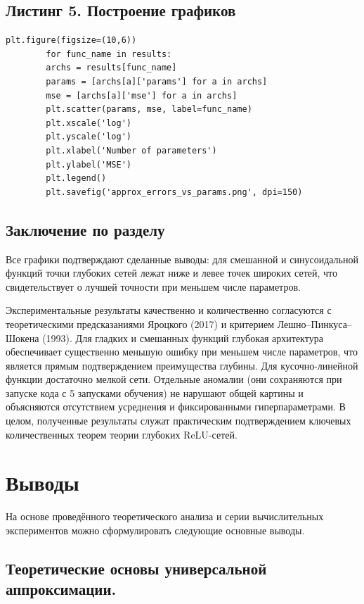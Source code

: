 \documentclass[12pt]{article}
\begin{document}
	\subsection*{Листинг 5. Построение графиков}
	\begin{lstlisting}[caption={Создание графика ошибки от числа параметров}, label=lst:plot]
		plt.figure(figsize=(10,6))
		for func_name in results:
		archs = results[func_name]
		params = [archs[a]['params'] for a in archs]   
		mse = [archs[a]['mse'] for a in archs]         
		plt.scatter(params, mse, label=func_name)    
		plt.xscale('log')                        
		plt.yscale('log')                        
		plt.xlabel('Number of parameters')
		plt.ylabel('MSE')
		plt.legend()
		plt.savefig('approx_errors_vs_params.png', dpi=150) 
	\end{lstlisting}
	
	\subsection{Заключение по разделу}
	
	Все графики подтверждают сделанные выводы: для смешанной и синусоидальной функций точки глубоких сетей лежат ниже и левее точек широких сетей, что свидетельствует о лучшей точности при меньшем числе параметров.
	
	Экспериментальные результаты качественно и количественно согласуются с теоретическими предсказаниями Яроцкого (2017) и критерием Лешно–Пинкуса–Шокена (1993). Для гладких и смешанных функций глубокая архитектура обеспечивает существенно меньшую ошибку при меньшем числе параметров, что является прямым подтверждением преимущества глубины. Для кусочно-линейной функции достаточно мелкой сети. Отдельные аномалии (они сохраняются при запуске кода с 5 запусками обучения) не нарушают общей картины и объясняются отсутствием усреднения и фиксированными гиперпараметрами. В целом, полученные результаты служат практическим подтверждением ключевых количественных теорем теории глубоких ReLU-сетей.
	
	\section{Выводы}
	
	На основе проведённого теоретического анализа и серии вычислительных экспериментов можно сформулировать следующие основные выводы.
	
	\subsection*{Теоретические основы универсальной аппроксимации.}
	
\end{document}

